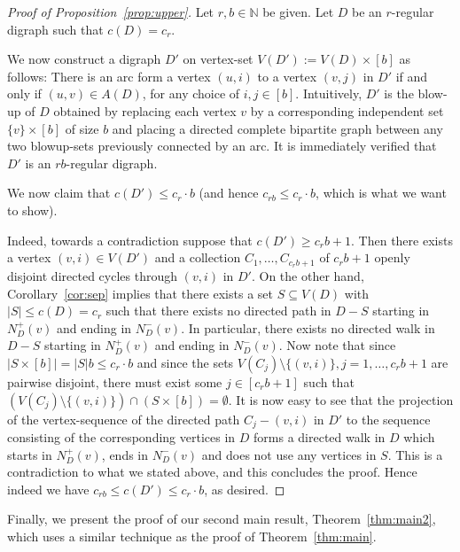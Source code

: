 \documentclass[a4paper,10pt]{article}
\begin{document}
\begin{proof}[Proof of Proposition~\ref{prop:upper}]
Let $r,b\in \mathbb{N}$ be given. Let $D$ be an $r$-regular digraph such that $c(D)=c_r$.

We now construct a digraph $D'$ on vertex-set $V(D'):=V(D)\times [b]$ as follows: There is an arc form a vertex $(u,i)$ to a vertex $(v,j)$ in $D'$ if and only if $(u,v)\in A(D)$, for any choice of $i,j\in [b]$. Intuitively, $D'$ is the blow-up of $D$ obtained by replacing each vertex $v$ by a corresponding independent set $\{v\}\times [b]$ of size $b$ and placing a directed complete bipartite graph between any two blowup-sets previously connected by an arc. It is immediately verified that $D'$ is an $rb$-regular digraph. 

We now claim that $c(D')\le c_r\cdot b$ (and hence $c_{rb}\le c_r\cdot b$, which is what we want to show). 

Indeed, towards a contradiction suppose that $c(D')\ge c_rb+1$. Then there exists a vertex $(v,i)\in V(D')$ and a collection $C_1,\ldots,C_{c_rb+1}$ of $c_rb+1$ openly disjoint directed cycles through $(v,i)$ in $D'$. On the other hand, Corollary~\ref{cor:sep} implies that there exists a set $S\subseteq V(D)$ with $|S|\le c(D)=c_r$ such that there exists no directed path in $D-S$ starting in $N_D^+(v)$ and ending in $N_D^-(v)$. In particular, there exists no directed walk in $D-S$ starting in $N_D^+(v)$ and ending in $N_D^-(v)$. Now note that since $|S\times [b]|=|S|b\le c_r\cdot b$ and since the sets $V(C_j)\setminus \{(v,i)\}, j=1,\ldots,c_rb+1$ are pairwise disjoint, there must exist some $j\in [c_rb+1]$ such that $(V(C_j)\setminus \{(v,i)\})\cap (S\times [b])=\emptyset$. It is now easy to see that the projection of the vertex-sequence of the directed path $C_j-(v,i)$ in $D'$ to the sequence consisting of the corresponding vertices in $D$ forms a directed walk in $D$ which starts in $N_D^+(v)$, ends in $N_D^-(v)$ and does not use any vertices in $S$. This is a contradiction to what we stated above, and this concludes the proof. Hence indeed we have $c_{rb}\le c(D')\le c_r\cdot b$, as desired.
\end{proof}
Finally, we present the proof of our second main result, Theorem~\ref{thm:main2}, which uses a similar technique as the proof of Theorem~\ref{thm:main}.
\end{document}
